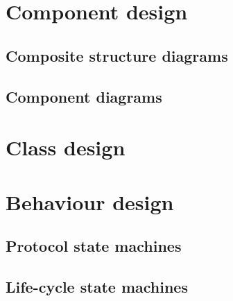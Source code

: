

\section{Component design}

\subsection{Composite structure diagrams}


\subsection{Component diagrams}


\section{Class design}


\section{Behaviour design}
\subsection{Protocol state machines}


\subsection{Life-cycle state machines}

